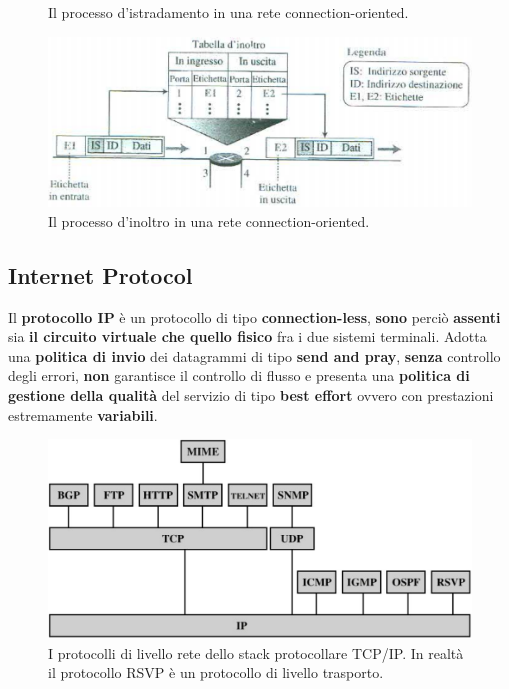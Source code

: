 \documentclass[11pt,a4paper,oneside]{book}
\theoremstyle{definition}
\begin{document}
\begin{itemize}
\begin{figure}[!h]
		      \centering
		      \caption{Il processo d'istradamento in una rete connection-oriented.}
	      \end{figure}
	      \begin{figure}[!h]
		      \includegraphics[scale=0.3]{Immagini/Ip_conn_table.png}
		      \centering
		      \caption{Il processo d'inoltro in una rete connection-oriented.}
	      \end{figure}
\end{itemize}

\pagebreak

\subsection{Internet Protocol}
Il \textbf{protocollo IP} è un protocollo di tipo \textbf{connection-less}, \textbf{sono} perciò \textbf{assenti} sia \textbf{il circuito virtuale che quello fisico} fra i due sistemi terminali. Adotta una \textbf{politica di invio} dei datagrammi di tipo \textbf{send and pray}, \textbf{senza} controllo degli errori, \textbf{non} garantisce il controllo di flusso e presenta una \textbf{politica di gestione della qualità} del servizio di tipo \textbf{best effort} ovvero con prestazioni estremamente \textbf{variabili}.

\begin{figure}[!h]
	\includegraphics[scale=0.2]{Immagini/IPv4.png}
	\centering
	\caption{I protocolli di livello rete dello stack protocollare TCP/IP. In realtà il protocollo RSVP è un protocollo di livello trasporto.}
\end{figure}
\end{document}

